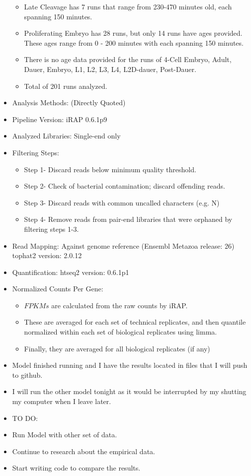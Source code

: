 \documentclass[letterpaper,index=totoc,hyperref,openany]{labbook} %
\begin{document}
\begin{itemize}
\begin{itemize}
\item Late Cleavage has 7 runs that range from 230-470 minutes old, each spanning 150 minutes.
\item Proliferating Embryo has 28 runs, but only 14 runs have ages provided. These ages range from 0 - 200 minutes with each spanning 150 minutes.
\item There is no age data provided for the runs of 4-Cell Embryo, Adult, Dauer, Embryo, L1, L2, L3, L4, L2D-dauer, Post-Dauer.
\item Total of 201 runs analyzed.
\end{itemize}
\item Analysis Methods: (Directly Quoted)
\item Pipeline Version: iRAP 0.6.1p9
\item Analyzed Libraries: Single-end only
\item Filtering Steps: 
\begin{itemize}
\item Step 1- Discard reads below minimum quality threshold.
\item Step 2- Check of bacterial contamination; discard offending reads.
\item Step 3- Discard reads with common uncalled characters (e.g. N)
\item Step 4- Remove reads from pair-end libraries that were orphaned by filtering steps 1-3.
\end{itemize}
\item Read Mapping: Against genome reference (Ensembl Metazoa release: 26) tophat2 version: 2.0.12
\item Quantification: htseq2 version: 0.6.1p1
\item Normalized Counts Per Gene: 
\begin{itemize}
\item \(FPKMs\) are calculated from the raw counts by iRAP. 
\item These are averaged for each set of technical replicates, and then quantile normalized within each set of biological replicates using limma. 
\item Finally, they are averaged for all biological replicates (if any)
\end{itemize}
\item Model finished running and I have the results located in files that I will push to github.
\item I will run the other model tonight as it would be interrupted by my shutting my computer when I leave later.
\item TO DO:
\item Run Model with other set of data.
\item Continue to research about the empirical data.
\item Start writing code to compare the results.
\end{itemize}
\end{document}
